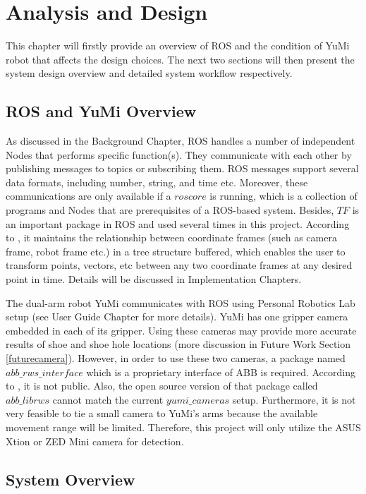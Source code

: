 \chapter{Analysis and Design}

This chapter will firstly provide an overview of ROS and the condition of YuMi robot that affects the design choices. The next two sections will then present the system design overview and detailed system workflow respectively.

\section{ROS and YuMi Overview}
As discussed in the Background Chapter, ROS handles a number of independent Nodes that performs specific function(s). They communicate with each other by publishing messages to topics or subscribing them. ROS messages support several data formats, including number, string, and time etc. Moreover, these communications are only available if a $roscore$ is running, which is a collection of programs and Nodes that are prerequisites of a ROS-based system. Besides, $TF$ is an important package in ROS and used several times in this project. According to \citep{tfROSWik}, it maintains the relationship between coordinate frames (such as camera frame, robot frame etc.) in a tree structure buffered, which enables the user to transform points, vectors, etc between any two coordinate frames at any desired point in time. Details will be discussed in Implementation Chapters.

The dual-arm robot YuMi communicates with ROS using Personal Robotics Lab setup (see User Guide Chapter for more details). YuMi has one gripper camera embedded in each of its gripper. Using these cameras may provide more accurate results of shoe and shoe hole locations (more discussion in Future Work Section \ref{futurecamera}). However, in order to use these two cameras, a package named $abb\_rws\_interface$ which is a proprietary interface of ABB is required. According to \citep{EGMfiles}, it is not public. Also, the open source version of that package called $abb\_librws$ cannot match the current $yumi\_cameras$ setup. Furthermore, it is not very feasible to tie a small camera to YuMi's arms because the available movement range will be limited. Therefore, this project will only utilize the ASUS Xtion or ZED Mini camera for detection.

\section{System Overview}

